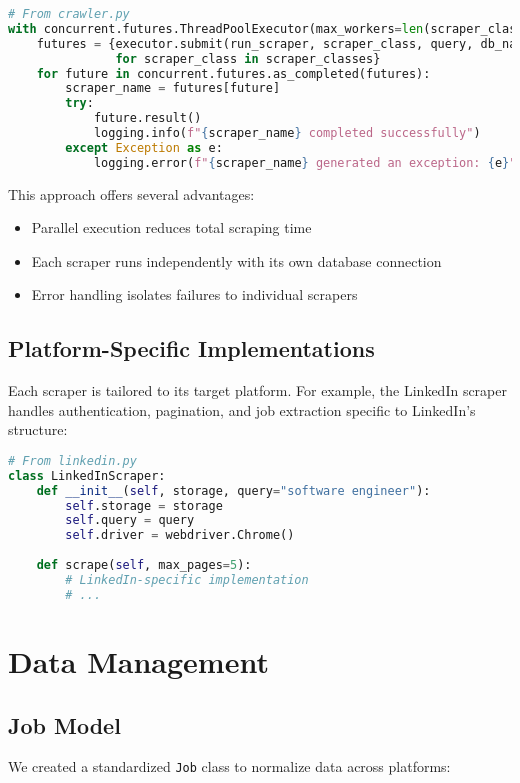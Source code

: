 \documentclass[12pt,a4paper]{report}
\begin{document}
\begin{lstlisting}[language=Python, caption=Concurrent Scraping Implementation]
# From crawler.py
with concurrent.futures.ThreadPoolExecutor(max_workers=len(scraper_classes)) as executor:
    futures = {executor.submit(run_scraper, scraper_class, query, db_name): scraper_class.__name__ 
               for scraper_class in scraper_classes}
    for future in concurrent.futures.as_completed(futures):
        scraper_name = futures[future]
        try:
            future.result()
            logging.info(f"{scraper_name} completed successfully")
        except Exception as e:
            logging.error(f"{scraper_name} generated an exception: {e}")
\end{lstlisting}

This approach offers several advantages:
\begin{itemize}
    \item Parallel execution reduces total scraping time
    \item Each scraper runs independently with its own database connection
    \item Error handling isolates failures to individual scrapers
\end{itemize}

\subsection{Platform-Specific Implementations}
Each scraper is tailored to its target platform. For example, the LinkedIn scraper handles authentication, pagination, and job extraction specific to LinkedIn's structure:

\begin{lstlisting}[language=Python, caption=LinkedIn Scraper (Excerpt)]
# From linkedin.py
class LinkedInScraper:
    def __init__(self, storage, query="software engineer"):
        self.storage = storage
        self.query = query
        self.driver = webdriver.Chrome()
        
    def scrape(self, max_pages=5):
        # LinkedIn-specific implementation
        # ...
\end{lstlisting}

\section{Data Management}

\subsection{Job Model}
We created a standardized \texttt{Job} class to normalize data across platforms:
\end{document}
